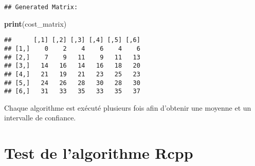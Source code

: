 \documentclass[
]{article}
\newenvironment{Shaded}{\begin{snugshade}}{\end{snugshade}}
\newcommand{\FunctionTok}[1]{\textcolor[rgb]{0.13,0.29,0.53}{\textbf{#1}}}
\newcommand{\NormalTok}[1]{#1}
\begin{document}
\begin{verbatim}
## Generated Matrix:
\end{verbatim}

\begin{Shaded}
\begin{Highlighting}[]
\FunctionTok{print}\NormalTok{(cost\_matrix)}
\end{Highlighting}
\end{Shaded}

\begin{verbatim}
##      [,1] [,2] [,3] [,4] [,5] [,6]
## [1,]    0    2    4    6    4    6
## [2,]    7    9   11    9   11   13
## [3,]   14   16   14   16   18   20
## [4,]   21   19   21   23   25   23
## [5,]   24   26   28   30   28   30
## [6,]   31   33   35   33   35   37
\end{verbatim}

Chaque algorithme est exécuté plusieurs fois afin d'obtenir une moyenne
et un intervalle de confiance.

\hypertarget{test-de-lalgorithme-rcpp}{%
\section{Test de l'algorithme Rcpp}\label{test-de-lalgorithme-rcpp}}
\end{document}
